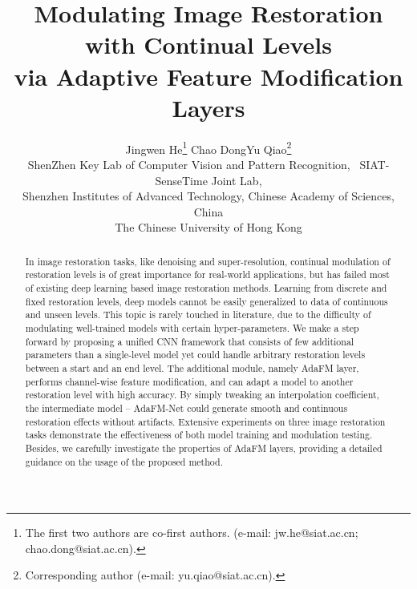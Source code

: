 \documentclass[10pt,twocolumn,letterpaper]{article}
\begin{document}

\title{Modulating Image Restoration with Continual Levels \\via Adaptive Feature Modification Layers}

\author{Jingwen He\thanks{The first two authors are co-first authors. (e-mail: jw.he@siat.ac.cn; chao.dong@siat.ac.cn).} \quad Chao Dong\footnotemark[1] \quad Yu Qiao\thanks{Corresponding author (e-mail: yu.qiao@siat.ac.cn).}\\
	ShenZhen Key Lab of Computer Vision and Pattern Recognition, \, SIAT-SenseTime Joint Lab, \\ 
	Shenzhen Institutes of Advanced Technology, Chinese Academy of Sciences, China\\
	The Chinese University of Hong Kong\\
}


\maketitle


\begin{abstract}

\vspace{-1em}
In image restoration tasks, like denoising and super-resolution, continual modulation of restoration levels is of great importance for real-world applications, but has failed most of existing deep learning based image restoration methods. Learning from discrete and fixed restoration levels, deep models cannot be easily generalized to data of continuous and unseen levels. This topic is rarely touched in literature, due to the difficulty of modulating well-trained models with certain hyper-parameters. We make a step forward by proposing a unified CNN framework that consists of few additional parameters than a single-level model yet could handle arbitrary restoration levels between a start and an end level. The additional module, namely AdaFM layer, performs channel-wise feature modification, and can adapt a model to another restoration level with high accuracy. By simply tweaking an interpolation coefficient, the intermediate model -- AdaFM-Net could generate smooth and continuous restoration effects without artifacts. Extensive experiments on three image restoration tasks demonstrate the effectiveness of both model training and modulation testing. Besides, we carefully investigate the properties of AdaFM layers, providing a detailed guidance on the usage of the proposed method.
\end{abstract}
\end{document}
